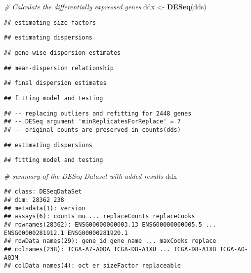 \documentclass[]{book}
\newenvironment{Shaded}{\begin{snugshade}}{\end{snugshade}}
\newcommand{\KeywordTok}[1]{\textcolor[rgb]{0.13,0.29,0.53}{\textbf{#1}}}
\newcommand{\StringTok}[1]{\textcolor[rgb]{0.31,0.60,0.02}{#1}}
\newcommand{\CommentTok}[1]{\textcolor[rgb]{0.56,0.35,0.01}{\textit{#1}}}
\newcommand{\NormalTok}[1]{#1}
\begin{document}
\begin{Shaded}
\begin{Highlighting}[]
\CommentTok{# Calculate the differentially expressed genes}
\NormalTok{ddx <-}\StringTok{ }\KeywordTok{DESeq}\NormalTok{(dds) }
\end{Highlighting}
\end{Shaded}

\begin{verbatim}
## estimating size factors
\end{verbatim}

\begin{verbatim}
## estimating dispersions
\end{verbatim}

\begin{verbatim}
## gene-wise dispersion estimates
\end{verbatim}

\begin{verbatim}
## mean-dispersion relationship
\end{verbatim}

\begin{verbatim}
## final dispersion estimates
\end{verbatim}

\begin{verbatim}
## fitting model and testing
\end{verbatim}

\begin{verbatim}
## -- replacing outliers and refitting for 2448 genes
## -- DESeq argument 'minReplicatesForReplace' = 7 
## -- original counts are preserved in counts(dds)
\end{verbatim}

\begin{verbatim}
## estimating dispersions
\end{verbatim}

\begin{verbatim}
## fitting model and testing
\end{verbatim}

\begin{Shaded}
\begin{Highlighting}[]
\CommentTok{# summary of the DESeq Dataset with added results}
\NormalTok{ddx }
\end{Highlighting}
\end{Shaded}

\begin{verbatim}
## class: DESeqDataSet 
## dim: 28362 238 
## metadata(1): version
## assays(6): counts mu ... replaceCounts replaceCooks
## rownames(28362): ENSG00000000003.13 ENSG00000000005.5 ... ENSG00000281912.1 ENSG00000281920.1
## rowData names(29): gene_id gene_name ... maxCooks replace
## colnames(238): TCGA-A7-A0DA TCGA-D8-A1XU ... TCGA-D8-A1XB TCGA-AO-A03M
## colData names(4): oct er sizeFactor replaceable
\end{verbatim}
\end{document}
